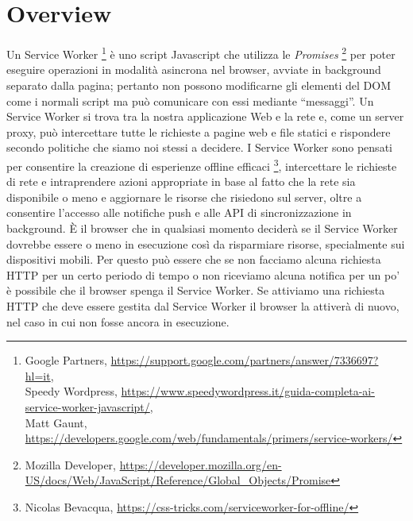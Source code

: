 \documentclass[11pt ,a4paper , twoside , openright ]{book}
\begin{document}
	\section{Overview}
	Un Service Worker \footnote{Google Partners, \url{https://support.google.com/partners/answer/7336697?hl=it}, \\ Speedy Wordpress, \url{https://www.speedywordpress.it/guida-completa-ai-service-worker-javascript/},\\ Matt Gaunt, \url{https://developers.google.com/web/fundamentals/primers/service-workers/}} è uno script Javascript che utilizza le \textit{Promises} \footnote{Mozilla Developer, \url{https://developer.mozilla.org/en-US/docs/Web/JavaScript/Reference/Global_Objects/Promise}} per poter eseguire operazioni in modalità asincrona nel browser, avviate in background separato dalla pagina; pertanto non possono modificarne gli elementi del DOM come i normali script ma può comunicare con essi mediante “messaggi”.
	Un Service Worker si trova tra la nostra applicazione Web e la rete e, come un server proxy, può intercettare tutte le richieste a pagine web e file statici e rispondere secondo politiche che siamo noi stessi a decidere.
	I Service Worker sono pensati per consentire la creazione di esperienze offline efficaci \footnote{Nicolas Bevacqua, \url{https://css-tricks.com/serviceworker-for-offline/}}, intercettare le richieste di rete e intraprendere azioni appropriate in base al fatto che la rete sia disponibile o meno e aggiornare le risorse che risiedono sul server, oltre a consentire l'accesso alle notifiche push e alle API di sincronizzazione in background.
	È il browser che in qualsiasi momento deciderà se il Service Worker dovrebbe essere o meno in esecuzione così da risparmiare risorse, specialmente sui dispositivi mobili. Per questo può essere che se non facciamo alcuna richiesta HTTP per un certo periodo di tempo o non riceviamo alcuna notifica per un po' è possibile che il browser spenga il Service Worker. Se attiviamo una richiesta HTTP che deve essere gestita dal Service Worker il browser la attiverà di nuovo, nel caso in cui non fosse ancora in esecuzione. 
	
\end{document}
